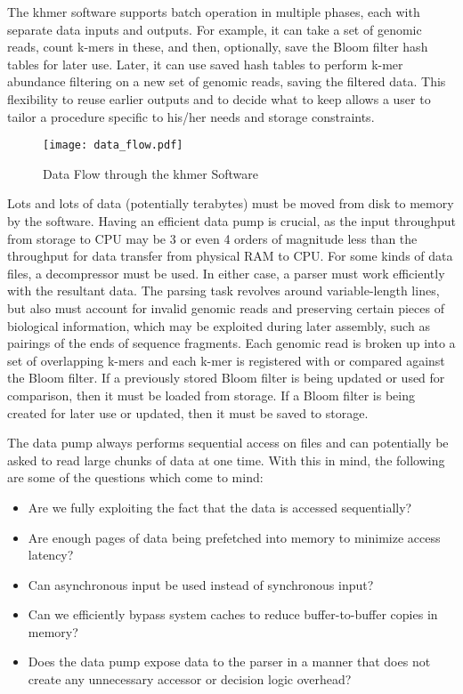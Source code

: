 The khmer software supports batch operation in multiple phases, each with
separate data inputs and outputs. For example, it can take a set of genomic
reads, count k-mers in these, and then, optionally, save the Bloom filter hash
tables for later use. Later, it can use saved hash tables to perform k-mer
abundance filtering on a new set of genomic reads, saving the filtered data.
This flexibility to reuse earlier outputs and to decide what to keep allows a
user to tailor a procedure specific to his/her needs and storage constraints.

\begin{figure}[ht!]
\centering
\texttt{[image: data\_flow.pdf]}
\caption{Data Flow through the khmer Software}
\label{khmerDataFlow}
\end{figure}

Lots and lots of data (potentially terabytes) must be moved from disk to memory
by the software. Having an efficient data pump is crucial, as the input
throughput from storage to CPU may be 3 or even 4 orders of magnitude less than
the throughput for data transfer from physical RAM to CPU. For some kinds of
data files, a decompressor must be used. In either case, a parser must work
efficiently with the resultant data. The parsing task revolves around
variable-length lines, but also must account for invalid genomic reads and
preserving certain pieces of biological information, which may be exploited
during later assembly, such as pairings of the ends of sequence fragments. Each
genomic read is broken up into a set of overlapping k-mers and each k-mer is
registered with or compared against the Bloom filter.  If a previously stored
Bloom filter is being updated or used for comparison, then it must be loaded
from storage.  If a Bloom filter is being created for later use or updated,
then it must be saved to storage.

The data pump always performs sequential access on files and can potentially be
asked to read large chunks of data at one time. With this in mind, the
following are some of the questions which come to mind:
\begin{itemize}
\item Are we fully exploiting the fact that the data is accessed sequentially?
\item Are enough pages of data being prefetched into memory to minimize access
latency?
\item Can asynchronous input be used instead of synchronous input?
\item Can we efficiently bypass system caches to reduce buffer-to-buffer copies
in memory?
\item Does the data pump expose data to the parser in a manner that
does not create any unnecessary accessor or decision logic overhead?
\end{itemize}

